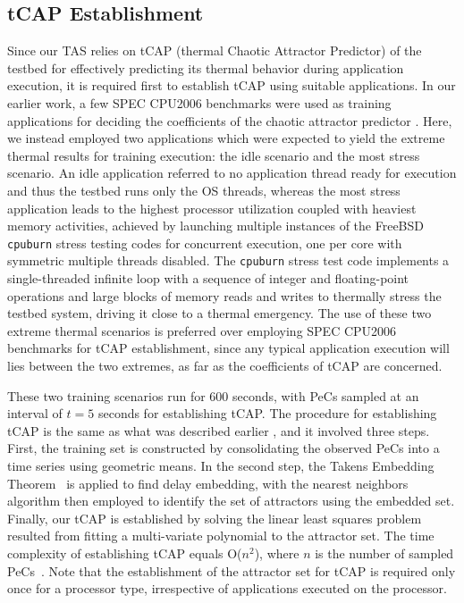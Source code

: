\documentclass[times, 10pt,twocolumn]{IEEEtran}
\begin{document}
\subsection{tCAP Establishment}
\label{sec:callibration}
Since our TAS relies on tCAP (thermal Chaotic Attractor Predictor) of
the testbed for effectively predicting its thermal behavior during
application execution, it is required first to establish tCAP using
suitable applications.  In our earlier work, a few SPEC CPU2006
benchmarks were used as training applications for deciding the
coefficients of the chaotic attractor predictor \cite{Lewis2010}.  Here,
we instead employed two applications which were expected to yield the
extreme thermal results for training execution: the idle scenario and
the most stress scenario.  An idle application referred to no
application thread ready for execution and thus the testbed runs only
the OS threads, whereas the most stress application leads to the highest
processor utilization coupled with heaviest memory activities, achieved
by launching multiple instances of the FreeBSD \texttt{cpuburn} stress
testing codes for concurrent execution, one per core with symmetric
multiple threads disabled.  The \texttt{cpuburn} stress test code
implements a single-threaded infinite loop with a sequence of integer
and floating-point operations and large blocks of memory reads and
writes to thermally stress the testbed system, driving it close to a
thermal emergency.  The use of these two extreme thermal scenarios is
preferred over employing SPEC CPU2006 benchmarks for tCAP establishment,
since any typical application execution will lies between the two
extremes, as far as the coefficients of tCAP are concerned.

These two training scenarios run for 600 seconds, with PeCs sampled at
an interval of $t=5$ seconds for establishing tCAP.  The procedure for
establishing tCAP is the same as what was described earlier
\cite{Lewis2010}, and it involved three steps. First, the training set
is constructed by consolidating the observed PeCs into a time series
using geometric means.  In the second step, the Takens Embedding
Theorem~\cite{Su2010} is applied to find delay embedding, with the
nearest neighbors algorithm then employed to identify the set of
attractors using the embedded set.  Finally, our tCAP is established by
solving the linear least squares problem resulted from fitting a
multi-variate polynomial to the attractor set.  The time complexity of
establishing tCAP equals O($n ^2$), where $n$ is the number of sampled
PeCs~\cite{Lewis2010}.  Note that the establishment of the attractor set
for tCAP is required only once for a processor type, irrespective of
applications executed on the processor.
\end{document}
